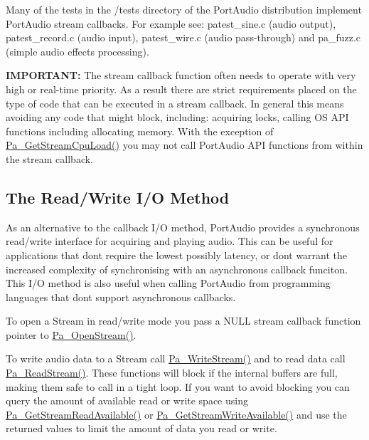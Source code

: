 Many of the tests in the /tests directory of the Port\+Audio distribution implement Port\+Audio stream callbacks. For example see\+: patest\+\_\+sine.\+c (audio output), patest\+\_\+record.\+c (audio input), patest\+\_\+wire.\+c (audio pass-\/through) and pa\+\_\+fuzz.\+c (simple audio effects processing).

{\bfseries I\+M\+P\+O\+R\+T\+A\+NT\+:} The stream callback function often needs to operate with very high or real-\/time priority. As a result there are strict requirements placed on the type of code that can be executed in a stream callback. In general this means avoiding any code that might block, including\+: acquiring locks, calling OS A\+PI functions including allocating memory. With the exception of \hyperlink{portaudio_8h_a83b8c624464dd7bb6a01b06ab596c115}{Pa\+\_\+\+Get\+Stream\+Cpu\+Load()} you may not call Port\+Audio A\+PI functions from within the stream callback.\hypertarget{api_overview_read_write_io_method}{}\subsection{The Read/\+Write I/\+O Method}\label{api_overview_read_write_io_method}
As an alternative to the callback I/O method, Port\+Audio provides a synchronous read/write interface for acquiring and playing audio. This can be useful for applications that don\textquotesingle{}t require the lowest possibly latency, or don\textquotesingle{}t warrant the increased complexity of synchronising with an asynchronous callback funciton. This I/O method is also useful when calling Port\+Audio from programming languages that don\textquotesingle{}t support asynchronous callbacks.

To open a Stream in read/write mode you pass a N\+U\+LL stream callback function pointer to \hyperlink{portaudio_8h_a443ad16338191af364e3be988014cbbe}{Pa\+\_\+\+Open\+Stream()}.

To write audio data to a Stream call \hyperlink{portaudio_8h_a075a6efb503a728213bdae24347ed27d}{Pa\+\_\+\+Write\+Stream()} and to read data call \hyperlink{portaudio_8h_a0b62d4b74b5d3d88368e9e4c0b8b2dc7}{Pa\+\_\+\+Read\+Stream()}. These functions will block if the internal buffers are full, making them safe to call in a tight loop. If you want to avoid blocking you can query the amount of available read or write space using \hyperlink{portaudio_8h_ad04c33f045fa58d7b705b56b1fd3e816}{Pa\+\_\+\+Get\+Stream\+Read\+Available()} or \hyperlink{portaudio_8h_a25595acf48733ec32045aa189c3caa61}{Pa\+\_\+\+Get\+Stream\+Write\+Available()} and use the returned values to limit the amount of data you read or write.

